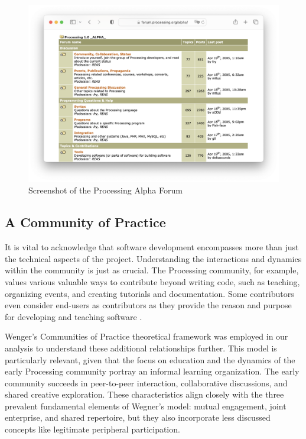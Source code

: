 
\begin{figure}
	\centering
	\includegraphics[width=1.0\textwidth]{images/alpha-browser.png}
	\caption{Screenshot of the Processing Alpha Forum}
	\label{fig:processing-alpha}
\end{figure}

\subsection{A Community of Practice}
It is vital to acknowledge that software development encompasses more than just the technical aspects of the project. Understanding the interactions and dynamics within the community is just as crucial. The Processing community, for example, values various valuable ways to contribute beyond writing code, such as teaching, organizing events, and creating tutorials and documentation. Some contributors even consider end-users as contributors as they provide the reason and purpose for developing and teaching software \parencite[41]{processingfoundation20thAnniversaryProcessing2022}. 

Wenger's Communities of Practice \parencite{wengerCommunitiesPracticeLearning1998} theoretical framework was employed in our analysis to understand these additional relationships further. This model is particularly relevant, given that the focus on education and the dynamics of the early Processing community portray an informal learning organization. The early community succeeds in peer-to-peer interaction, collaborative discussions, and shared creative exploration. These characteristics align closely with the three prevalent fundamental elements of Wegner's model: mutual engagement, joint enterprise, and shared repertoire, but they also incorporate less discussed concepts like legitimate peripheral participation. 

